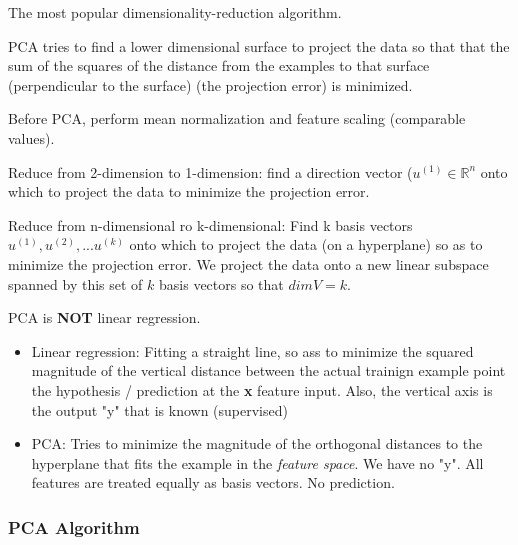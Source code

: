 \documentclass{article}
\begin{document}
The most popular dimensionality-reduction algorithm.

PCA tries to find a lower dimensional surface to project the data so that that the sum of the squares of the distance from the examples to that surface (perpendicular to the surface) (the projection error) is minimized.

Before PCA, perform mean normalization and feature scaling (comparable values).


Reduce from 2-dimension to 1-dimension: find a direction vector ($u^{(1)} \in \mathbb{R}^n$ onto which to project the data to minimize the projection error.

Reduce from n-dimensional ro k-dimensional: Find k basis vectors $u^{(1)}, u^{(2)}, ... u^{(k)}$ onto which to project the data (on a hyperplane) so as to minimize the projection error. We project the data onto a new linear subspace spanned by this set of $k$ basis vectors so that $dim V = k$.


\begin{myboxr}
PCA is \textbf{NOT} linear regression. 

\begin{itemize}
    \item Linear regression: Fitting a straight line, so ass to minimize the squared magnitude of the vertical distance between the actual trainign example point the hypothesis / prediction at the \textbf{x} feature input. Also, the vertical axis is the output "y" that is known (supervised)
    \item PCA: Tries to minimize the magnitude of the orthogonal distances to the hyperplane that fits the example in the \textit{feature space}. We have no "y". All features are treated equally as basis vectors. No prediction.
\end{itemize}
\end{myboxr}


\subsubsection{PCA Algorithm}
\end{document}
